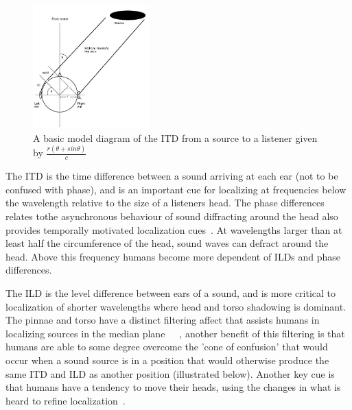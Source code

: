 \documentclass[paper=a4, fontsize=10pt, font=arial]{scrartcl} %
\numberwithin{equation}{section} %
\numberwithin{figure}{section} %
\numberwithin{table}{section} %
\begin{document}
\begin{figure}[H]
\centering
\includegraphics[width=0.4\textwidth]{itdexample.jpg}
\centering
\caption{A basic model diagram of the ITD from a source to a listener given by $\frac{r(\theta + sin \theta)}{\textit{c}}$ ~\cite{rumsey2012spatial}}
\end{figure} 

The ITD is the time difference between a sound arriving at each ear (not to be confused with phase), and is an important cue for localizing at frequencies below the wavelength relative to the size of a listeners head. The phase differences relates tothe asynchronous behaviour of sound diffracting around the head also provides temporally motivated localization cues~\cite{Aaronson2014}. At wavelengths larger than at least half the circumference of the head, sound waves can defract around the head. Above this frequency humans become more dependent of ILDs and phase differences. 


The ILD is the level difference between ears of a sound, and is more critical to localization of shorter wavelengths where head and torso shadowing is dominant. The pinnae and torso have a distinct filtering affect that assists humans in localizing sources in the median plane~\cite{Blauert1997}~\cite{Begault1995}~\cite{Wiggins2004}, another benefit of this filtering is that humans are able to some degree overcome the 'cone of confusion' that would occur when a sound source is in a position that would otherwise produce the same ITD and ILD as another position (illustrated below). Another key cue is that humans have a tendency to move their heads, using the changes in what is heard to refine localization~\cite{Blauert1997}.
\end{document}
